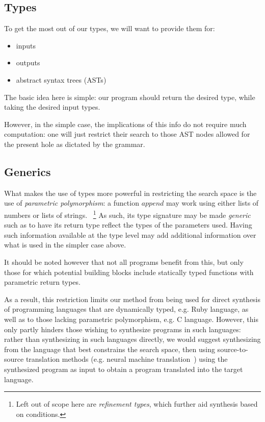 \documentclass{article}
\begin{document}
\subsection{Types}

To get the most out of our types, we will want to provide them for:
\begin{itemize}
    \item inputs
    \item outputs
    \item abstract syntax trees (ASTs)
\end{itemize}

The basic idea here is simple: our program should return the desired type, while taking the desired input types.

However, in the simple case, the implications of this info do not require much computation:
one will just restrict their search to those AST nodes allowed for the present hole as dictated by the grammar.

\subsection{Generics}

What makes the use of types more powerful in restricting the search space is the use of \emph{parametric polymorphism}:
a function $append$ may work using either lists of numbers or lists of strings.
~\footnote{Left out of scope here are \emph{refinement types}, which further aid synthesis based on conditions.}
As such, its type signature may be made \emph{generic} such as to have its return type reflect the types of the parameters used.
Having such information available at the type level may add additional information over what is used in the simpler case above.

It should be noted however that not all programs benefit from this,
but only those for which potential building blocks include statically typed functions with parametric return types.

As a result, this restriction limits our method from being used for direct synthesis of programming languages that are dynamically typed,
e.g. Ruby language, as well as to those lacking parametric polymorphism, e.g. C language.
However, this only partly hinders those wishing to synthesize programs in such languages:
rather than synthesizing in such languages directly, we would suggest synthesizing from the language that best constrains the search space,
then using source-to-source translation methods (e.g. neural machine translation~\citep{kalchbrenner2013recurrent})
using the synthesized program as input to obtain a program translated into the target language.
\end{document}
